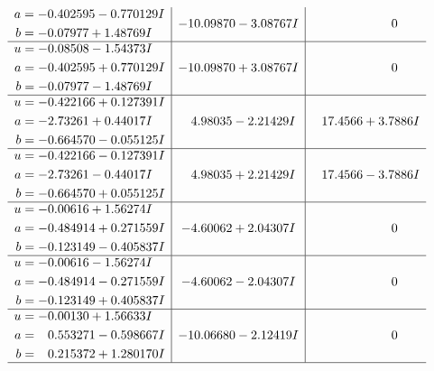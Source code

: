 \documentclass[1p]{elsarticle_modified}
\theoremstyle{definition}
\begin{document}
$$\begin{array}{c|c|c}
\begin{aligned}
a &= -0.402595 - 0.770129 I \\
b &= -0.07977 + 1.48769 I\end{aligned}
 & -10.09870 - 3.08767 I & \phantom{-0.000000 } 0 \\ \hline\begin{aligned}
u &= -0.08508 - 1.54373 I \\
a &= -0.402595 + 0.770129 I \\
b &= -0.07977 - 1.48769 I\end{aligned}
 & -10.09870 + 3.08767 I & \phantom{-0.000000 } 0 \\ \hline\begin{aligned}
u &= -0.422166 + 0.127391 I \\
a &= -2.73261 + 0.44017 I \\
b &= -0.664570 - 0.055125 I\end{aligned}
 & \phantom{-}4.98035 - 2.21429 I & \phantom{-}17.4566 + 3.7886 I \\ \hline\begin{aligned}
u &= -0.422166 - 0.127391 I \\
a &= -2.73261 - 0.44017 I \\
b &= -0.664570 + 0.055125 I\end{aligned}
 & \phantom{-}4.98035 + 2.21429 I & \phantom{-}17.4566 - 3.7886 I \\ \hline\begin{aligned}
u &= -0.00616 + 1.56274 I \\
a &= -0.484914 + 0.271559 I \\
b &= -0.123149 - 0.405837 I\end{aligned}
 & -4.60062 + 2.04307 I & \phantom{-0.000000 } 0 \\ \hline\begin{aligned}
u &= -0.00616 - 1.56274 I \\
a &= -0.484914 - 0.271559 I \\
b &= -0.123149 + 0.405837 I\end{aligned}
 & -4.60062 - 2.04307 I & \phantom{-0.000000 } 0 \\ \hline\begin{aligned}
u &= -0.00130 + 1.56633 I \\
a &= \phantom{-}0.553271 - 0.598667 I \\
b &= \phantom{-}0.215372 + 1.280170 I\end{aligned}
 & -10.06680 - 2.12419 I & \phantom{-0.000000 } 0\\
 \hline 
 \end{array}$$\newpage$$\begin{array}{c|c|c}  

\end{array}$$
\end{document}
